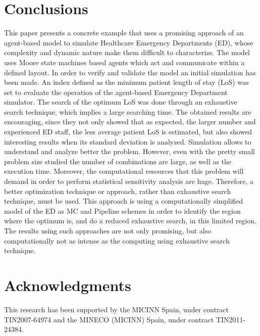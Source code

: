 \documentclass[11pt]{article} %
\begin{document}
\section{Conclusions}
\label{sec:conclu}

This paper presents a concrete example that uses a promising approach of an agent-based model to simulate Healthcare Emergency 
Departments (ED), whose complexity and dynamic nature make them difficult to characterize.  The model uses Moore state machines 
based agents which act and communicate within a defined layout. In order to verify and validate the model an initial simulation has 
been made. 
An index defined as the minimum patient length of stay (LoS) was set to evaluate the operation of the agent-based Emergency 
Department simulator. The search of the optimum LoS was done through an exhaustive search technique, which implies a large 
searching time. The obtained results are encouraging, since they not only showed that as expected, the larger number and 
experienced ED staff, the less average patient LoS is estimated, but also showed interesting results when its standard deviation is 
analyzed. Simulation allows to understand and analyze better the problem. However, even with the pretty small problem size studied 
the number of combinations are large, as well as the execution time. Moreover, the computational resources that this problem will 
demand in order to perform statistical sensitivity analysis are huge. Therefore, a better optimization technique or approach, rather than exhaustive search technique, must be used. This approach is using a computationally simplified model of the ED as MC and Pipeline schemes in order to identify the region where the optimum is, and do a reduced exhaustive search, in this limited region. The results using such approaches are not only promising, but also computationally not as intense as the computing using exhaustive search technique. 


\section*{Acknowledgments}
This research has been supported by the MICINN Spain, under contract TIN2007-64974 and the MINECO (MICINN) Spain, under contract TIN2011-24384.
 


\end{document}
